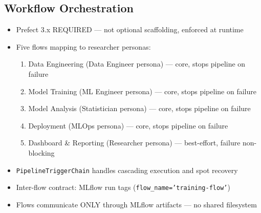 
\subsection{Workflow Orchestration}
\begin{itemize}
  \item Prefect 3.x REQUIRED --- not optional scaffolding, enforced at runtime
  \item Five flows mapping to researcher personas:
    \begin{enumerate}
      \item Data Engineering (Data Engineer persona) --- core, stops pipeline on failure
      \item Model Training (ML Engineer persona) --- core, stops pipeline on failure
      \item Model Analysis (Statistician persona) --- core, stops pipeline on failure
      \item Deployment (MLOps persona) --- core, stops pipeline on failure
      \item Dashboard \& Reporting (Researcher persona) --- best-effort, failure non-blocking
    \end{enumerate}
  \item \texttt{PipelineTriggerChain} handles cascading execution and spot recovery
  \item Inter-flow contract: MLflow run tags (\texttt{flow\_name='training-flow'})
  \item Flows communicate ONLY through MLflow artifacts --- no shared filesystem
\end{itemize}


